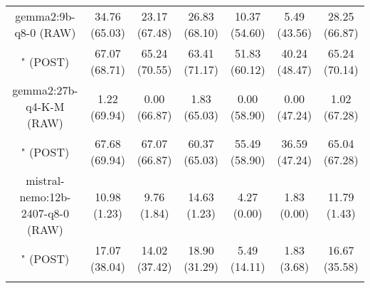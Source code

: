 \begin{table}[]
{\begin{tabular}{ccccccc}
      \multicolumn{1}{c|}{gemma2:9b-q8-0 (RAW)} & 34.76 (65.03) & 23.17 (67.48) & \multicolumn{1}{c|}{26.83 (68.10)} & 10.37 (54.60) & \multicolumn{1}{c|}{5.49 (43.56)} & 28.25 (66.87) \\

      \multicolumn{1}{c|}{" (POST)} & 67.07 (68.71) & 65.24 (70.55) & \multicolumn{1}{c|}{63.41 (71.17)} & 51.83 (60.12) & \multicolumn{1}{c|}{40.24 (48.47)} & 65.24 (70.14) \\
      \cline{1-7}

      \multicolumn{1}{c|}{gemma2:27b-q4-K-M (RAW)} & 1.22 (69.94) & 0.00 (66.87) & \multicolumn{1}{c|}{1.83 (65.03)} & 0.00 (58.90) & \multicolumn{1}{c|}{0.00 (47.24)} & 1.02 (67.28) \\

      \multicolumn{1}{c|}{" (POST)} & 67.68 (69.94) & 67.07 (66.87) & \multicolumn{1}{c|}{60.37 (65.03)} & 55.49 (58.90) & \multicolumn{1}{c|}{36.59 (47.24)} & 65.04 (67.28) \\
      \cline{1-7}

      \multicolumn{1}{c|}{mistral-nemo:12b-2407-q8-0 (RAW)} & 10.98 (1.23) & 9.76 (1.84) & \multicolumn{1}{c|}{14.63 (1.23)} & 4.27 (0.00) & \multicolumn{1}{c|}{1.83 (0.00)} & 11.79 (1.43) \\

      \multicolumn{1}{c|}{" (POST)} & 17.07 (38.04) & 14.02 (37.42) & \multicolumn{1}{c|}{18.90 (31.29)} & 5.49 (14.11) & \multicolumn{1}{c|}{1.83 (3.68)} & 16.67 (35.58) \\
      \cline{1-7}

      \\ \hline
    \end{tabular}%
  }
\end{table}
